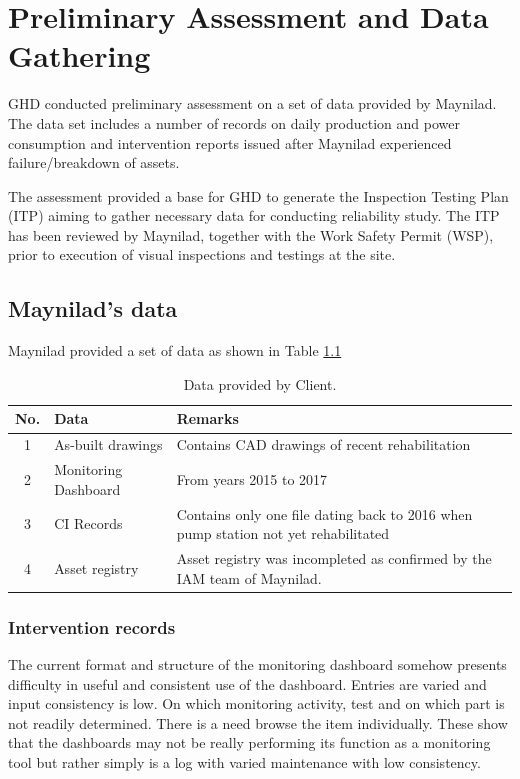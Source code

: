 \chapter{Preliminary Assessment and Data Gathering} %
\label{Chapter2}
GHD conducted preliminary assessment on a set of data provided by Maynilad. The data set includes a number of records on daily production and power consumption and intervention reports issued after Maynilad experienced failure/breakdown of assets.

The assessment provided a base for GHD to generate the Inspection Testing Plan (ITP) \cite{GHD2018k, GHD2018o} aiming to gather necessary data for conducting reliability study. The ITP has been reviewed by Maynilad, together with the Work Safety Permit (WSP), prior to execution of visual inspections and testings at the site.

\section{Maynilad's data}
\label{21}
Maynilad provided a set of data as shown in Table \ref{mayniladdata}

\begin{table}[h]
	\caption{Data provided by Client.}
	\label{mayniladdata}
	{\footnotesize
\begin{tabular}{l|p{5cm}|p{8cm}}
	\hline
	\multicolumn{1}{c|}{No.} & Data & Remarks \\ 
	\hline
	\multicolumn{1}{c|}{1} & As-built drawings &  Contains CAD drawings of recent rehabilitation
	\\ 
	\multicolumn{1}{c|}{2} & Monitoring Dashboard & From years 2015 to 2017 \\ 
	\multicolumn{1}{c|}{3} & CI Records & Contains only one file dating back to 2016 when pump station not yet rehabilitated\\ 
	\multicolumn{1}{c|}{4} & Asset registry & Asset registry was incompleted as confirmed by the IAM team of Maynilad. \\ 
	\hline
\end{tabular}
	}
\end{table}


\subsection{Intervention records}
\label{212}
The current format and structure of the monitoring dashboard somehow presents difficulty in useful and consistent use of the dashboard. Entries are varied and input consistency is low. On which monitoring activity, test and on which part is not readily determined. There is a need browse the item individually. These show that the dashboards may not be really performing its function as a monitoring tool but rather simply is a log with varied maintenance with low consistency. 

